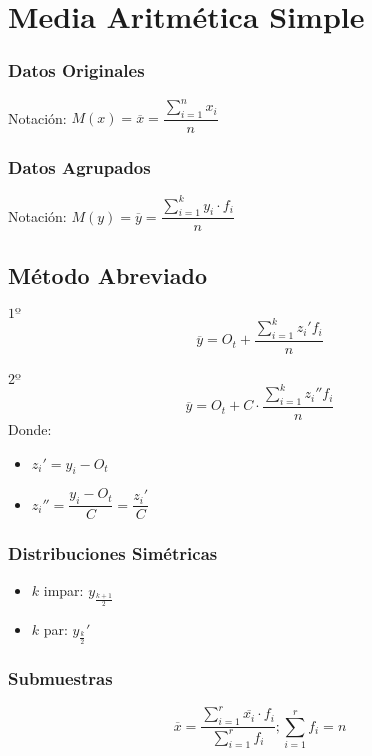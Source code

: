 \documentclass[10pt,letterpaper]{article}
\begin{document}
\section{Media Aritmética Simple}
\begin{multicols}{2}
\subsubsection*{Datos Originales}
\begin{flushleft}
Notación:  $M(x)=\overline{x}=\dfrac{\displaystyle\sum_{i=1}^{n} x_i }{n}$
\end{flushleft}
\columnbreak
\subsubsection*{Datos Agrupados}
\begin{flushleft}
Notación:  $M(y)=\overline{y}=\dfrac{\displaystyle\sum_{i=1}^{k} y_i\cdot f_i }{n}$
\end{flushleft}
\end{multicols}

\subsection{Método Abreviado}


\begin{multicols}{2}
\noindent $1º$
  $$\overline{y}=O_t + \dfrac{\displaystyle\sum_{i=1}^{k} z_i'f_i}{n}$$
  \\
  $2º$
  $$\overline{y}=O_t + C\cdot\dfrac{\displaystyle\sum_{i=1}^{k} z_i''f_i}{n}$$
  Donde:
\begin{itemize}
\item $z_i'=y_i-O_t $
\item $z_i''=\dfrac{y_i-O_t}{C}=\dfrac{z_i'}{C}$
\end{itemize}
  
\columnbreak
\subsubsection*{Distribuciones Simétricas}
\begin{itemize}
\item $k$ impar:  $y_\frac{k+1}{2}$
\item $k$ par:    $y_\frac{k}{2}'$
\end{itemize}
\subsubsection*{Submuestras}
$$\overline{x}=\dfrac{\displaystyle\sum_{i=1}^{r}\overline{x_i}\cdot f_i}{\displaystyle\sum_{i=1}^{r}f_i};\displaystyle\sum_{i=1}^{r}f_i = n$$
\end{multicols}
\end{document}
